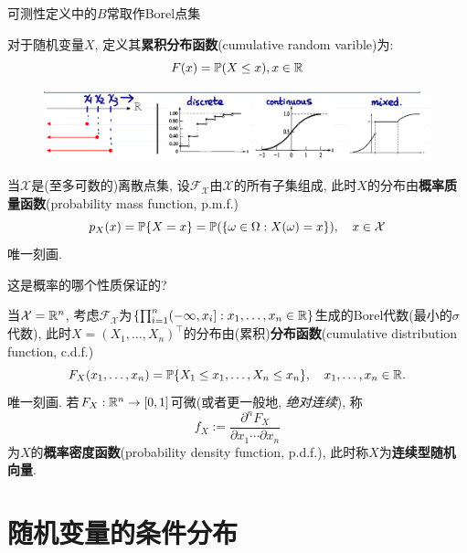 \documentclass[../main]{subfiles}
\begin{document}
\begin{remark}
    可测性定义中的$B$常取作Borel点集
\end{remark}

\begin{definition}[累积分布函数]
    对于随机变量$X$, 定义其\textbf{累积分布函数}(cumulative random varible)为:
    \[ F(x)= \P(X \le  x), x \in \R \]
\end{definition}

\begin{figure}[h]
    \centering
    \includegraphics{image/cdf.png}
\end{figure}

\begin{definition}[概率质量函数]
    当$\mathcal{X}$是(至多可数的)离散点集, 设$\mathscr{F}_{\mathcal{X}}$由$\mathcal{X}$的所有子集组成, 此时$X$的分布由\textbf{概率质量函数}(probability mass function, p.m.f.)
    \[ p_{X}(x) = \P\{X=x\} = \P(\{\omega\in\Omega:X(\omega)=x\}), \quad x\in\mathcal{X} \]
    唯一刻画.
\end{definition}

\begin{remark}
    这是概率的哪个性质保证的?
\end{remark}

\begin{definition}
    当$\mathcal{X} = \R^{n}$, 考虑$\mathscr{F}_{\mathcal{X}}$为$\left\{\prod_{i=1}^{n}(-\infty,x_{i}] : x_{1},\dots,x_{n}\in\R\right\}$生成的Borel代数(最小的$\sigma$代数), 此时$X = (X_{1},\dots,X_{n})^{\top}$的分布由(累积)\textbf{分布函数}(cumulative distribution function, c.d.f.)
    \[ F_{X}(x_{1},\dots,x_{n}) = \P\{X_{1}\leq x_{1},\dots, X_{n}\leq x_{n}\}, \quad x_{1},\dots,x_{n}\in\R. \]
    唯一刻画. 若$F_{X} : \R^{n} \to [0,1]$可微(或者更一般地, \emph{绝对连续}), 称
    \[ f_{X} := \frac{\partial^{n} F_{X}}{\partial x_{1} \cdots \partial x_{n}} \]
    为$X$的\textbf{概率密度函数}(probability density function, p.d.f.), 此时称$X$为\textbf{连续型随机向量}.
\end{definition}

\section{随机变量的条件分布}
\end{document}
